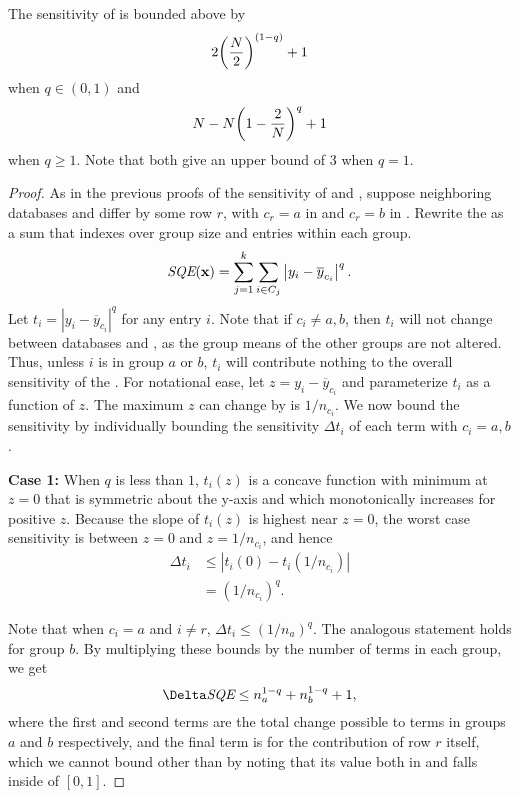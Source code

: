 \setcounter{theorem}{6}
\begin{theorem}  \label{thm:SQEsens-appendix} 
The sensitivity of \sqe is bounded above by
\begin{equation*}
2\bigg(\frac{N}{2}\bigg)^{(1-q)} + 1
\end{equation*}
when $q \in (0,1)$ and
\begin{equation*}
N - N\bigg(1-\frac{2}{N}\bigg)^q +1 
\end{equation*}
when $q\geq 1$. Note that both give an upper bound of 3 when $q=1$.
\end{theorem}
\begin{proof}
As in the previous proofs of the sensitivity of \se and \sa, suppose neighboring databases \x and \xprime differ by some row $r$, with $c_r = a$ in \x and $c_r = b$ in \xprime. Rewrite the \sqe as a sum that indexes over group size and entries within each group.
$$\textit{SQE}(\mathbf{x}) = \sum_{j=1}^k \sum_{i \in C_j} \left\vert  y_i - \overline{y}_{c_i} \right\vert^q.$$
%
Let $t_i =  \left\vert y_{i} - \overline{y}_{c_i} \right\vert ^q$ for any entry $i$.  Note that if $c_i \neq a,b$, then $t_i$ will not change between databases \x and \xprime, as the group means of the other groups are not altered. Thus, unless $i$ is in group $a$ or $b$, $t_i$ will contribute nothing to the overall sensitivity of the \sqe. For notational ease, let $z = y_i-\overline{y}_{c_i}$ and parameterize $t_i$ as a function of $z$. The maximum $z$ can change by is $1/n_{c_i}$. We now bound the sensitivity by individually bounding the sensitivity $\Delta t_i$ of each term with  $c_i = a,b$.   

\smallskip\noindent\textbf{Case 1:}
When $q$ is less than $1$, $t_i(z)$ is a concave function with minimum at $z=0$ that is symmetric about the y-axis and which monotonically increases for positive $z$. Because the slope of $t_i(z)$ is highest near $z=0$, the worst case sensitivity is between $z = 0$ and $z = 1/n_{c_i}$, and hence
\begin{align*}
\Delta t_{i} &\le \left\vert t_i(0) - t_i(1/n_{c_i}) \right\vert \\
	&= (1/n_{c_i})^q.
\end{align*}

Note that when $c_i = a$ and $i \neq r$, $\Delta t_i \leq (1/n_a)^q$.  The analogous statement holds for group $b$.  By multiplying these bounds by the number of terms in each group, we get
\begin{equation*}
\Delta \sqe \le  n_a^{1-q} + n_b^{1-q} + 1,
\end{equation*}
where the first and second terms are the total change possible to terms in groups $a$ and $b$ respectively, and the final term is for the contribution of row $r$ itself, which we cannot bound other than by noting that its value both in \x and \xprime falls inside of $[0,1]$.


\end{proof}
